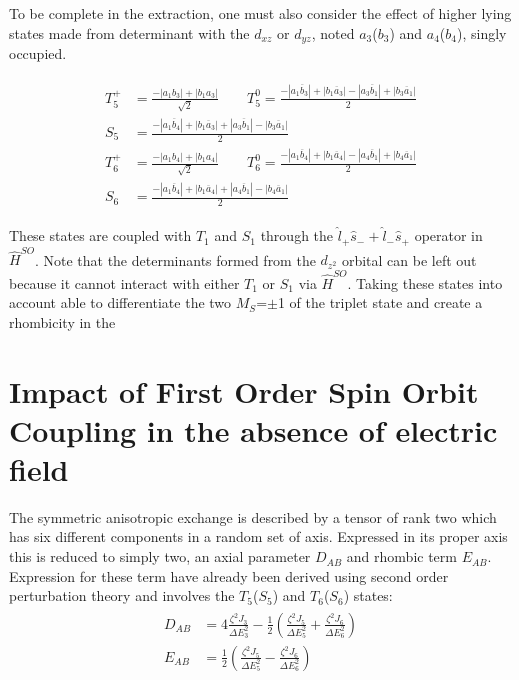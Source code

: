 \documentclass[10pt]{report}
\numberwithin{equation}{section}
\begin{document}
To be complete in the extraction, one must also consider the effect of higher lying states made from determinant with the $d_{xz}$ or $d_{yz}$, noted $a_3$($b_3$) and $a_4$($b_4$), singly occupied. 

\begin{align}\label{T5T6}
    \begin{split}
        T_5^+&=\frac{-|a_1b_3|+|b_1a_3|}{\sqrt{2}} \qquad T_5^0=\frac{-|a_1\overline{b}_3|+|b_1\overline{a}_3|-|a_3\overline{b}_1|+|b_3\overline{a}_1|}{2}\\
        S_5&=\frac{-|a_1\overline{b}_4|+|b_1\overline{a}_3|+|a_3\overline{b}_1|-|b_3\overline{a}_1|}{2}\\
        T_6^+&=\frac{-|a_1b_4|+|b_1a_4|}{\sqrt{2}} \qquad T_6^0=\frac{-|a_1\overline{b}_4|+|b_1\overline{a}_4|-|a_4\overline{b}_1|+|b_4\overline{a}_1|}{2}\\
        S_6&=\frac{-|a_1\overline{b}_4|+|b_1\overline{a}_4|+|a_4\overline{b}_1|-|b_4\overline{a}_1|}{2}
    \end{split}
\end{align}

These states are coupled with $T_1$ and $S_1$ through the $\hat{l}_+ \hat{s}_- + \hat{l}_-\hat{s}_+$ operator in $\hat{H}^{SO}$.
Note that the determinants formed from the $d_{z^2}$ orbital can be left out because it cannot interact with either $T_1$ or $S_1$ via $\hat{H}^{SO}$.
Taking these states into account able to differentiate the two $M_S$=$\pm$1 of the triplet state and create a rhombicity in the 

\section{Impact of First Order Spin Orbit Coupling in the absence of electric field}

The symmetric anisotropic exchange is described by a tensor of rank two which has six different components in a random set of axis.
Expressed in its proper axis this is reduced to simply two, an axial parameter $D_{AB}$ and rhombic term $E_{AB}$.
Expression for these term have already been derived using second order perturbation theory and involves the $T_5$($S_5$) and $T_6$($S_6$) states:
\begin{align}\label{eq:PertCu2Cl5}
    \begin{split}
        D_{AB}&=4\frac{\zeta^2 J_3}{\Delta E^2_3}-\frac{1}{2}(\frac{\zeta^2 J_5}{\Delta E^2_5}+\frac{\zeta^2 J_6}{\Delta E^2_6})\\
        E_{AB}&=\frac{1}{2}(\frac{\zeta^2 J_5}{\Delta E^2_5}-\frac{\zeta^2 J_6}{\Delta E^2_6})
    \end{split}
\end{align}
\end{document}
